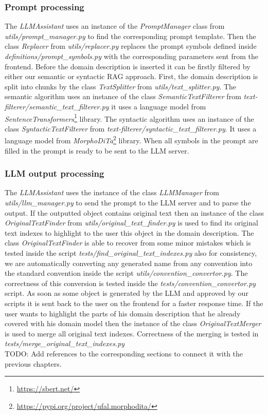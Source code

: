 \subsubsection{Prompt processing}

The \textit{LLMAssistant} uses an instance of the \textit{PromptManager} class from \textit{utils/prompt\_manager.py} to find the corresponding prompt template.
Then the class \textit{Replacer} from \textit{utils/replacer.py} replaces the prompt symbols defined inside \textit{definitions/prompt\_symbols.py} with the corresponding parameters sent from the frontend. Before the domain description is inserted it can be firstly filtered by either our semantic or syntactic RAG approach. First, the domain description is split into chunks by the class \textit{TextSplitter} from \textit{utils/text\_splitter.py}. The semantic algorithm uses an instance of the class \textit{SemanticTextFilterer} from \textit{text-filterer/semantic\_text\_filterer.py} it uses a language model from \textit{SentenceTransformers}\footnote{\url{https://sbert.net/}} library. The syntactic algorithm uses an instance of the class \textit{SyntacticTextFilterer} from \textit{text-filterer/syntactic\_text\_filterer.py}. It uses a language model from \textit{MorphoDiTa}\footnote{\url{https://pypi.org/project/ufal.morphodita/}} library. When all symbols in the prompt are filled in the prompt is ready to be sent to the LLM server.


\subsubsection{LLM output processing}

The \textit{LLMAssistant} uses the instance of the class \textit{LLMManager} from \textit{utils/llm\_manager.py} to send the prompt to the LLM server and to parse the output. If the outputted object contains original text then an instance of the class \textit{OriginalTextFinder} from \textit{utils/original\_text\_finder.py} is used to find its original text indexes to highlight to the user this object in the domain description. The class \textit{OriginalTextFinder} is able to recover from some minor mistakes which is tested inside the script \textit{tests/find\_original\_text\_indexes.py}
also for consistency, we are automatically converting any generated name from any convention into the standard convention inside the script \textit{utils/convention\_convertor.py}. The correctness of this conversion is tested inside the \textit{tests/convention\_convertor.py} script. As soon as some object is generated by the LLM and approved by our scripts it is sent back to the user on the frontend for a faster response time. If the user wants to highlight the parts of his domain description that he already covered with his domain model then the instance of the class \textit{OriginalTextMerger} is used to merge all original text indexes. Correctness of the merging is tested in \textit{tests/merge\_original\_text\_indexes.py} \\

\noindent{}TODO: Add references to the corresponding sections to connect it with the previous chapters.